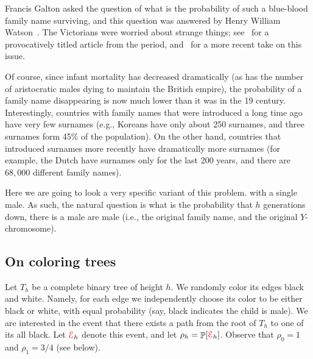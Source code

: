 Francis Galton asked the question of what is the probability of such a
blue-blood family name surviving, and this question was answered by
Henry William Watson~\cite{wg-pef-1875}. The Victorians were worried
about strange things; see~\cite{g-wwr-1869} for a provocatively titled
article from the period, and~\cite{s-wnrsf-12} for a more recent take
on this issue.

Of course, since infant mortality has decreased dramatically (as has the
number of aristocratic males dying to maintain the British empire), the
probability of a family name disappearing is now much lower than it was
in the 19\th{} century.  Interestingly, countries with family names that
were introduced a long time ago have very few surnames (e.g., Koreans
have only about 250 surnames, and three surnames form 45\% of the population). On
the other hand, countries that introduced surnames more recently have
dramatically more surnames (for example, the Dutch have surnames only
for the last 200 years, and there are $68,000$ different family
names).

Here we are going to look  a very specific variant of this
problem.  with a single male.
As such, the natural question is what is the probability that $h$
generations down, there is a male  are male (i.e.,  the original family name, and the original
$Y$-chromosome).



\subsection{On coloring trees}

Let $T_h$ be a complete binary tree of height $h$. We randomly color
its edges black and white. Namely, for each edge we independently
choose its color to be either black or white, with equal probability
(say, black indicates the child is male). We are interested in the
event that there exists a path from the root of $T_h$ to one of its
 all black. Let ${\textcolor{red}{\EuScript{E}}}_h$ denote this event, and let
$\rho_h = \Prob{\Event_h}$. Observe that $\rho_0 =1$ and $\rho_1 =
3/4$ (see below).


